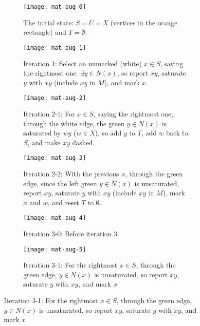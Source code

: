 \documentclass[../src/handouts/main.tex]{subfiles}
\begin{document}
\begin{figure}
  \def\width{.3\textwidth}%
  \def\gap{\hspace{.04\textwidth}}%
  \centering
  \begin{subfigure}[t]{\width}
    \centering
    \texttt{[image: mat-aug-0]}
    \caption{The initial state: $S = U = X$ (vertices in the orange rectangle) and $T = \emptyset$.}
    \label{fig:mat-aug-0}
  \end{subfigure}
  \gap
  \begin{subfigure}[t]{\width}
    \centering
    \texttt{[image: mat-aug-1]}
    \caption{Iteration 1: Select an unmarked (white) $x \in S$, saying the rightmost one. $\exists y \in N(x)$, so report $xy$, saturate $y$ with $xy$ (include $xy$ in $M$), and mark $x$.}
    \label{fig:mat-aug-1}
  \end{subfigure}
  \gap
  \begin{subfigure}[t]{\width}
    \centering
    \texttt{[image: mat-aug-2]}
    \caption{Iteration 2-1: For $x \in S$, saying the rightmost one, through the white edge, the green $y \in N(x)$ is saturated by $wy$ ($w \in X$), so add $y$ to $T$, add $w$ back to $S$, and make $xy$ dashed.}
    \label{fig:mat-aug-2-1}
  \end{subfigure}

  \begin{subfigure}[t]{\width}
    \centering
    \texttt{[image: mat-aug-3]}
    \caption{Iteration 2-2: With the previous $x$, through the green edge, since the left green $y \in N(x)$ is unsaturated, report $xy$, saturate $y$ with $xy$ (include $xy$ in $M$), mark $x$ and $w$, and reset $T$ to $\emptyset$.}
    \label{fig:mat-aug-2-2}
  \end{subfigure}
  \gap
  \begin{subfigure}[t]{\width}
    \centering
    \texttt{[image: mat-aug-4]}
    \caption{Iteration 3-0: Before iteration 3.}
    \label{fig:mat-aug-3-0}
  \end{subfigure}
  \gap
  \begin{subfigure}[t]{\width}
    \centering
    \texttt{[image: mat-aug-5]}
    \caption{Iteration 3-1: For the rightmost $x \in S$, through the green edge, $y \in N(x)$ is unsaturated, so report $xy$, saturate $y$ with $xy$, and mark $x$}
    \label{fig:mat-aug-3-1}
  \end{subfigure}


\end{figure}
\end{document}
